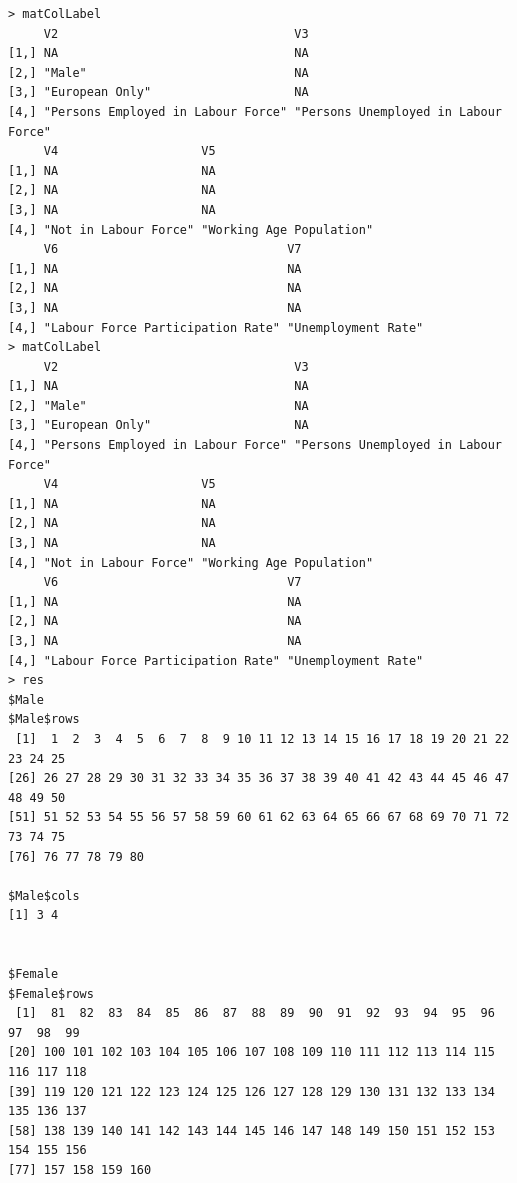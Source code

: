 \documentclass[a4paper]{article}
\begin{document}
\begin{verbatim}
> matColLabel 
     V2                                 V3                                  
[1,] NA                                 NA                                  
[2,] "Male"                             NA                                  
[3,] "European Only"                    NA                                  
[4,] "Persons Employed in Labour Force" "Persons Unemployed in Labour Force"
     V4                    V5                      
[1,] NA                    NA                      
[2,] NA                    NA                      
[3,] NA                    NA                      
[4,] "Not in Labour Force" "Working Age Population"
     V6                                V7                 
[1,] NA                                NA                 
[2,] NA                                NA                 
[3,] NA                                NA                 
[4,] "Labour Force Participation Rate" "Unemployment Rate"
> matColLabel 
     V2                                 V3                                  
[1,] NA                                 NA                                  
[2,] "Male"                             NA                                  
[3,] "European Only"                    NA                                  
[4,] "Persons Employed in Labour Force" "Persons Unemployed in Labour Force"
     V4                    V5                      
[1,] NA                    NA                      
[2,] NA                    NA                      
[3,] NA                    NA                      
[4,] "Not in Labour Force" "Working Age Population"
     V6                                V7                 
[1,] NA                                NA                 
[2,] NA                                NA                 
[3,] NA                                NA                 
[4,] "Labour Force Participation Rate" "Unemployment Rate"
> res 
$Male
$Male$rows
 [1]  1  2  3  4  5  6  7  8  9 10 11 12 13 14 15 16 17 18 19 20 21 22 23 24 25
[26] 26 27 28 29 30 31 32 33 34 35 36 37 38 39 40 41 42 43 44 45 46 47 48 49 50
[51] 51 52 53 54 55 56 57 58 59 60 61 62 63 64 65 66 67 68 69 70 71 72 73 74 75
[76] 76 77 78 79 80

$Male$cols
[1] 3 4


$Female
$Female$rows
 [1]  81  82  83  84  85  86  87  88  89  90  91  92  93  94  95  96  97  98  99
[20] 100 101 102 103 104 105 106 107 108 109 110 111 112 113 114 115 116 117 118
[39] 119 120 121 122 123 124 125 126 127 128 129 130 131 132 133 134 135 136 137
[58] 138 139 140 141 142 143 144 145 146 147 148 149 150 151 152 153 154 155 156
[77] 157 158 159 160


\end{verbatim}
\end{document}
